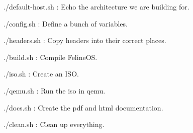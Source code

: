 \documentclass[12pt]{article}
\begin{document}
\begin{list}{}{}
\begin{list}{}{\begin{bf}Usefull commands\end{bf}}
\item ./default-host.sh : Echo the architecture we are building for.
\item ./config.sh : Define a bunch of variables.
\item ./headers.sh : Copy headers into their correct places.
\item ./build.sh : Compile FelineOS.
\item ./iso.sh : Create an ISO.
\item ./qemu.sh : Run the iso in qemu.
\item ./docs.sh : Create the pdf and html documentation.
\item ./clean.sh : Clean up everything.
\end{list}

\end{list}
\end{document}
